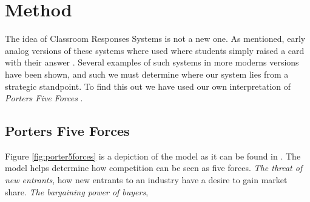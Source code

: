 \section{Method}



The idea of Classroom Responses Systems is not a new one. As mentioned, early analog versions of these systems where used where students simply raised a card with their answer \cite[p.~257]{stowell2007benefits}. Several examples of such systems in more moderns versions have been shown, and such we must determine where our system lies from a strategic standpoint. To find this out we have used our own interpretation of \emph{Porters Five Forces} \cite{porter1979competitive}.


\subsection{Porters Five Forces}
Figure \ref{fig:porter5forces} is a depiction of the model as it can be found in . The model helps determine how competition can be seen as five forces. \emph{The threat of new entrants}, how new entrants to an industry have a desire to gain market share. \emph{The bargaining power of buyers}, 






